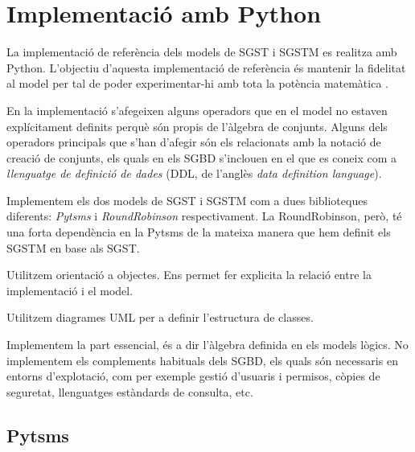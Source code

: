 

\chapter{Implementació amb Python}


La implementació de referència dels models de SGST i SGSTM es realitza
amb Python. L'objectiu d'aquesta implementació de
referència és mantenir la fidelitat al model per tal de poder
experimentar-hi amb tota la potència matemàtica .

En la implementació s'afegeixen alguns operadors que en el model no
estaven explícitament definits perquè són propis de l'àlgebra de
conjunts. Alguns dels operadors principals que s'han d'afegir són els
relacionats amb la notació de creació de conjunts, els quals en els
SGBD s'inclouen en el que es coneix com a \emph{llenguatge de
  definició de dades} (DDL, de l'anglès \emph{data definition
  language}).





Implementem els dos models de SGST i SGSTM com a dues biblioteques
diferents: \emph{Pytsms} i \emph{RoundRobinson} respectivament. La
RoundRobinson, però, té una forta dependència en la
Pytsms de la mateixa manera que hem definit els SGSTM en base
als SGST.


Utilitzem orientació a objectes. Ens permet fer explicita la relació
entre la implementació i el model. 

Utilitzem diagrames UML per a definir l'estructura de classes. 


Implementem la part essencial, és a dir l'àlgebra definida en els
models lògics. No implementem els complements habituals dels SGBD, els
quals són necessaris en entorns d'explotació, com per exemple gestió
d'usuaris i permisos, còpies de seguretat, llenguatges estàndards de
consulta, etc.




\section{Pytsms}

